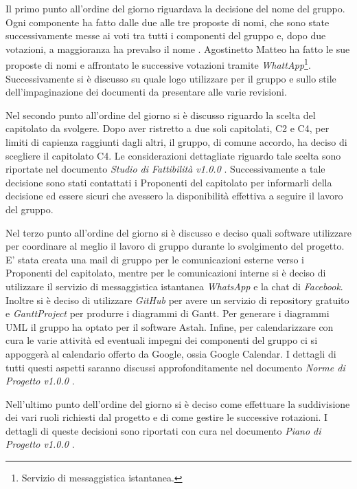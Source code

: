 Il primo punto all'ordine del giorno riguardava la decisione del nome del gruppo. Ogni componente ha fatto dalle due alle tre proposte di nomi, che sono state successivamente messe ai voti tra tutti i componenti del gruppo e, dopo due votazioni, a maggioranza ha prevalso il nome \GRUPPO. Agostinetto Matteo ha fatto le sue proposte di nomi e affrontato le successive votazioni tramite \textit{WhattApp}\footnote{Servizio di messaggistica istantanea.}. Successivamente si è discusso su quale logo utilizzare per il gruppo e sullo stile dell'impaginazione dei documenti da presentare alle varie revisioni.

\noindent Nel secondo punto all'ordine del giorno si è discusso riguardo la scelta del capitolato da svolgere. Dopo aver ristretto a due soli capitolati, C2 e C4, per limiti di capienza raggiunti dagli altri, il gruppo, di comune accordo, ha deciso di scegliere il capitolato C4. Le considerazioni dettagliate riguardo tale scelta sono riportate nel documento \textit{Studio di Fattibilità v1.0.0} . Successivamente a tale decisione sono stati contattati i Proponenti del capitolato per informarli della decisione ed essere sicuri che avessero la disponibilità effettiva a seguire il lavoro del gruppo.

\noindent Nel terzo punto all'ordine del giorno si è discusso e deciso quali software utilizzare per coordinare al meglio il lavoro di gruppo durante lo svolgimento del progetto. E' stata creata una mail di gruppo per le comunicazioni esterne verso i Proponenti del capitolato, mentre per le comunicazioni interne si è deciso di utilizzare il servizio di messaggistica istantanea \textit{WhatsApp} e la chat di \textit{Facebook}. Inoltre si è deciso di utilizzare \textit{GitHub} per avere un servizio di repository gratuito e \textit{GanttProject} per produrre i diagrammi di Gantt. Per generare i diagrammi UML il gruppo ha optato per il software Astah. Infine, per calendarizzare con cura le varie attività ed eventuali impegni dei componenti del gruppo ci si appoggerà al calendario offerto da Google, ossia Google Calendar. I dettagli di tutti questi aspetti saranno discussi approfonditamente nel documento \textit{Norme di Progetto v1.0.0} .

\noindent Nell'ultimo punto dell'ordine del giorno si è deciso come effettuare la suddivisione dei vari ruoli richiesti dal progetto e di come gestire le successive rotazioni. I dettagli di queste decisioni sono riportati con cura nel documento \textit{Piano di Progetto v1.0.0} .